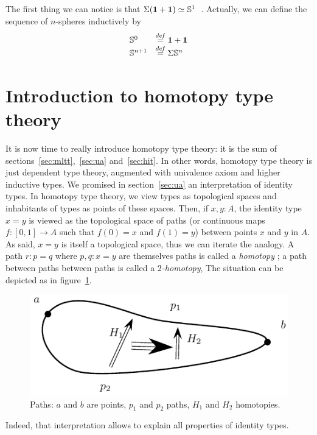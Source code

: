 The first thing we can notice is that $\Sigma(\mathbf{1}+\mathbf{1}) \simeq
\mathbb{S}^1$~\cite[Lemma 6.5.1]{hottbook}. Actually, we can define the
sequence of $n$-spheres inductively by
\[
  \begin{array}{ll}
    \mathbb S^0 &\overset{de\hspace{-0.2ex}f}{=} \mathbf{1}+\mathbf{1} \\
    \mathbb S^{n+1} &\overset{de\hspace{-0.2ex}f}{=} \Sigma \mathbb S^n
  \end{array}
\]

\section{Introduction to homotopy type theory}
\label{sec:hott}

It is now time to really introduce homotopy type theory: it is the sum
of sections~\ref{sec:mltt},~\ref{sec:ua} and~\ref{sec:hit}. In other
words, homotopy type theory is just dependent type theory, augmented
with univalence axiom and higher inductive types. We promised in
section~\ref{sec:ua} an interpretation of identity types. In homotopy
type theory, we view types as topological spaces and inhabitants of types
as points of these spaces. Then, if $x,y:A$, the identity type $x=y$
is viewed as the topological space of paths (or continuous maps
$f:[0,1]\to A$ such that $f(0)=x$ and $f(1)=y$) between points $x$ and
$y$ in $A$. As said, $x=y$ is itself a topological space, thus we can
iterate the analogy. A path $r:p=q$ where $p,q:x=y$ are themselves
paths is called a {\em homotopy} ; a path between paths between paths
is called a {\em $2$-homotopy}, \etc{}
The situation can be depicted as in figure~\ref{fig:paths}.
\begin{figure}[h]
  \centering
  \includegraphics{path2}  
  \caption{Paths: $a$ and $b$ are points, $p_1$ and $p_2$ paths, $H_1$
  and $H_2$ homotopies.}
  \label{fig:paths}
\end{figure}
Indeed, that interpretation allows to explain all properties of
identity types.
